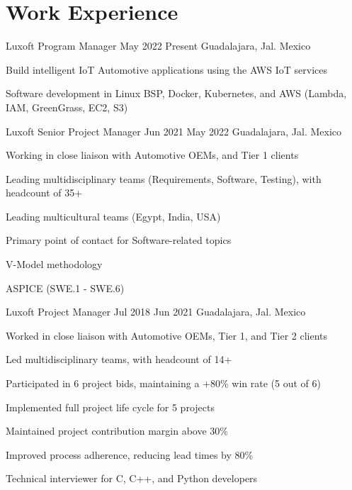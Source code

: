 
\section{Work Experience}

\job
    {Luxoft}
    {Program Manager}
    {May 2022}
    {Present}
    {Guadalajara, Jal. Mexico}
    {
        \begin{itemize-bullets}
            \item{Build intelligent IoT Automotive applications using the AWS IoT services}
            \item{Software development in Linux BSP, Docker, Kubernetes, and AWS (Lambda, IAM, GreenGrass, EC2, S3)}
        \end{itemize-bullets}
    }

\job
    {Luxoft}
    {Senior Project Manager}
    {Jun 2021}
    {May 2022}
    {Guadalajara, Jal. Mexico}
    {
        \begin{itemize-bullets}
            \item{Working in close liaison with Automotive OEMs, and Tier 1 clients}
            \item{Leading multidisciplinary teams (Requirements, Software, Testing), with headcount of 35+}
            \item{Leading multicultural teams (Egypt, India, USA)}
            \item{Primary point of contact for Software-related topics}
            \item{V-Model methodology}
            \item{ASPICE (SWE.1 - SWE.6)}
        \end{itemize-bullets}
    }


\job
    {Luxoft}
    {Project Manager}
    {Jul 2018}
    {Jun 2021}
    {Guadalajara, Jal. Mexico}
    {
        \begin{itemize-bullets}
            \item{Worked in close liaison with Automotive OEMs, Tier 1, and Tier 2 clients}
            \item{Led multidisciplinary teams, with headcount of 14+}
            \item{Participated in 6 project bids, maintaining a +80\% win rate (5 out of 6)}
            \item{Implemented full project life cycle for 5 projects}
            \item{Maintained project contribution margin above 30\% }
            \item{Improved process adherence, reducing lead times by 80\%}
            \item{Technical interviewer for C, C++, and Python developers}
        \end{itemize-bullets}
    }

